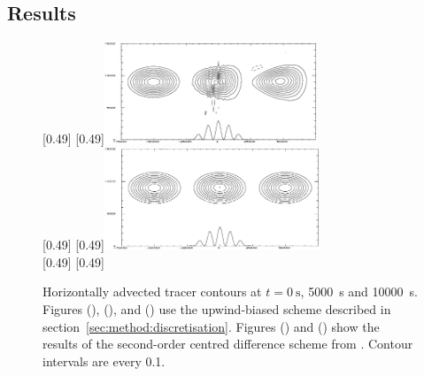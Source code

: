 \subsection{Results}
\begin{figure}
	\captionsetup[subfigure]{position=b}
	\centering
	[0.49\textwidth]{}
	\hfill
	[0.49\textwidth]{\vspace{0.43in}\includegraphics[height=1.2in]{img/schaer-btf-centred.png}}
\\
	[0.49\textwidth]{}
	\hfill
	[0.49\textwidth]{\vspace{0.43in}\includegraphics[height=1.2in]{img/schaer-sleve-centred.png}}
\\
	[0.49\textwidth]{}
	\hfill
	[0.49\textwidth]{}
%
	\caption{Horizontally advected tracer contours at $t = \SI{0}{\second}$, \SI{5000}{\second} and \SI{10000}{\second}.  Figures (\protect{}), (\protect{}), and (\protect{}) use the upwind-biased scheme described in section~\ref{sec:method:discretisation}.  Figures (\protect{}) and (\protect{}) show the results of the second-order centred difference scheme from \textcite{schaer2002}.  Contour intervals are every 0.1.}
	\label{fig:advection:cubicUpwind}
\end{figure}

